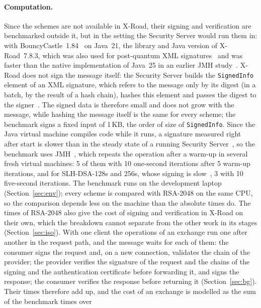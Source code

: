 \documentclass[conference,a4paper]{IEEEtran}
\newcommand{\newtext}[1]{{\color{blue}#1}}
\begin{document}
{\paragraph{Computation.} \newtext{Since the schemes are not available in X-Road, their signing and
verification are benchmarked outside it, but in the setting the Security Server would run them in:
with BouncyCastle~1.84\newtext{~\cite{bouncycastle}} on Java~21, the library and Java version of X-Road~7.8.3, which was also used for post-quantum XML signatures~\cite{mueller2024} and was faster
than the native implementation of Java~25 in an earlier JMH study~\cite{oleksiichuk2026}.
X-Road does not sign the message itself: the Security Server builds the
\texttt{SignedInfo} element of an XML signature, which refers to the message only by its digest (in a
batch, by the result of a hash chain), hashes this element and passes the digest to the signer\newtext{~\cite{xroadsrc}}. The signed data is therefore small and does not grow with the
message, while hashing the message itself is the same for every scheme; the benchmark signs a fixed
input of 1\,KB, the order of size of \texttt{SignedInfo}. Since the Java virtual machine compiles code while it runs, a signature
measured right after start is slower than in the steady state of a running Security
Server~\cite{georges2007}, so the benchmark uses JMH\newtext{~\cite{jmh}}, which repeats the operation after a warm-up in
several fresh virtual machines: 5 of them with 10 one-second iterations after 5 warm-up iterations,
and for SLH-DSA-128s and 256s, whose signing is slow~\cite{mueller2024}, 3 with 10 five-second
iterations. \newtext{The benchmark runs on the development laptop (Section~\ref{sec:env}); every
scheme is compared with RSA-2048 on the same CPU, so the comparison depends less on the machine than
the absolute times do. The times of RSA-2048 also give the cost of signing and verification in
X-Road on their own, which the breakdown cannot separate from the other work in its stages
(Section~\ref{sec:iso}).} With one client the operations of an exchange run one after another in the request path, and
the message waits for each of them: the consumer signs the request and, on a new connection,
validates the chain of the provider; the provider verifies the signature of the request and the
chains of the signing and the authentication certificate before forwarding it, and signs the
response; the consumer verifies the response before returning it (Section~\ref{sec:bg}). Their times
therefore add up, and the cost of an exchange is modelled as the sum of the benchmark times over
}}
\end{document}
